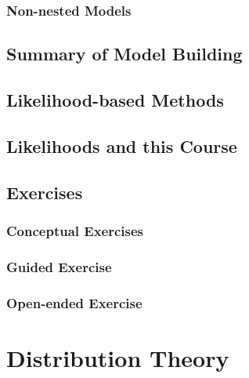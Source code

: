 \documentclass[
]{krantz}
\begin{document}
\hypertarget{non-nested-models}{%
\subsection{Non-nested Models}\label{non-nested-models}}

\hypertarget{summary-of-model-building}{%
\section{Summary of Model Building}\label{summary-of-model-building}}

\hypertarget{likelihood-based-methods}{%
\section{Likelihood-based Methods}\label{likelihood-based-methods}}

\hypertarget{likelihoods-and-this-course}{%
\section{Likelihoods and this Course}\label{likelihoods-and-this-course}}

\hypertarget{exercises-1}{%
\section{Exercises}\label{exercises-1}}

\hypertarget{conceptual-exercises-1}{%
\subsection{Conceptual Exercises}\label{conceptual-exercises-1}}

\hypertarget{guided-exercise}{%
\subsection{Guided Exercise}\label{guided-exercise}}

\hypertarget{open-ended-exercise}{%
\subsection{Open-ended Exercise}\label{open-ended-exercise}}

\hypertarget{ch-distthry}{%
\chapter{Distribution Theory}\label{ch-distthry}}
\end{document}
